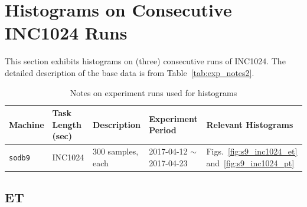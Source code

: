 \clearpage

\section{Histograms on Consecutive INC1024 Runs~\label{sec:s9_1024_runs}} 
This section exhibits histograms on (three) consecutive runs of INC1024. 
The detailed description of the base data is from Table~\ref{tab:exp_notes2}.

\begin{table}[h]
\begin{center}
\begin{tabular}{|p{2cm}|p{3cm}|p{3cm}|p{4cm}|p{3.5cm}|} \hline
Machine & Task Length (sec) & Description & Experiment Period & Relevant \linebreak Histograms\\ \hline
{\tt sodb9} &  INC1024 & 300 samples, each & 2017-04-12 $\sim$ 2017-04-23 & 
Figs.~\ref{fig:s9_inc1024_et} and~\ref{fig:s9_inc1024_pt}\\ \hline
\end{tabular}
\end{center}
\vspace{-.2in}
\caption{Notes on experiment runs used for histograms\label{tab:inc1024_run_notes}}
\end{table}


\subsection{ET}

